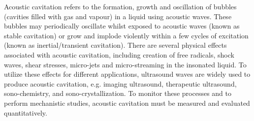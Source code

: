\documentclass[preprint, linenumbers]{revtex4-2}
\begin{document}
Acoustic cavitation refers to the formation, growth and oscillation of bubbles (cavities filled with gas and vapour) in a liquid using acoustic waves. \cite{leighton1994} These bubbles may periodically oscillate whilst exposed to acoustic waves (known as stable cavitation) or grow and implode violently within a few cycles of excitation (known as inertial/transient cavitation). There are several physical effects associated with acoustic cavitation, including creation of free radicals, shock waves, shear stresses, micro-jets and micro-streaming in the insonated liquid.\cite{leighton1994} To utilize these effects for different applications, ultrasound waves are widely used to produce acoustic cavitation, e.g. imaging ultrasound,\cite{salgaonkar2009,averkiou2020} therapeutic ultrasound, \cite{kooiman2020,coussios2008,stride2019} sono-chemistry,\cite{bhangu2017,suslick1999} and sono-crystallization.\cite{haqshenas2016,haqshenas2018,lee2018,chow2003} To monitor these processes and to perform mechanistic studies, acoustic cavitation must be measured and evaluated quantitatively.
\end{document}
